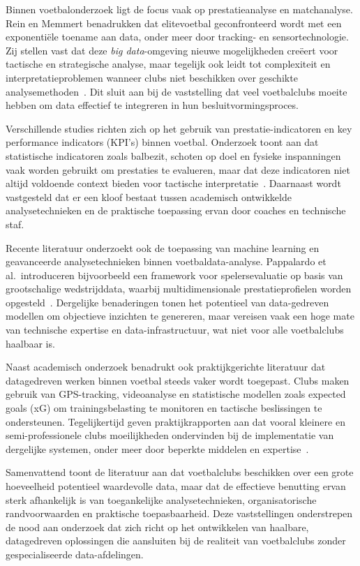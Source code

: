 Binnen voetbalonderzoek ligt de focus vaak op prestatieanalyse en matchanalyse.
Rein en Memmert benadrukken dat elitevoetbal geconfronteerd wordt met een exponentiële toename aan data, onder meer door tracking- en sensortechnologie.
Zij stellen vast dat deze \textit{big data}-omgeving nieuwe mogelijkheden creëert voor tactische en strategische analyse, maar tegelijk ook leidt tot complexiteit en interpretatieproblemen wanneer clubs niet beschikken over geschikte analysemethoden~\autocite{Rein2016}.
Dit sluit aan bij de vaststelling dat veel voetbalclubs moeite hebben om data effectief te integreren in hun besluitvormingsproces.

Verschillende studies richten zich op het gebruik van prestatie-indicatoren en key performance indicators (KPI's) binnen voetbal.
Onderzoek toont aan dat statistische indicatoren zoals balbezit, schoten op doel en fysieke inspanningen vaak worden gebruikt om prestaties te evalueren, maar dat deze indicatoren niet altijd voldoende context bieden voor tactische interpretatie~\autocite{Sarmento2014}.
Daarnaast wordt vastgesteld dat er een kloof bestaat tussen academisch ontwikkelde analysetechnieken en de praktische toepassing ervan door coaches en technische staf.

Recente literatuur onderzoekt ook de toepassing van machine learning en geavanceerde analysetechnieken binnen voetbaldata-analyse.
Pappalardo et al.\ introduceren bijvoorbeeld een framework voor spelersevaluatie op basis van grootschalige wedstrijddata, waarbij multidimensionale prestatieprofielen worden opgesteld~\autocite{Pappalardo2019}.
Dergelijke benaderingen tonen het potentieel van data-gedreven modellen om objectieve inzichten te genereren, maar vereisen vaak een hoge mate van technische expertise en data-infrastructuur, wat niet voor alle voetbalclubs haalbaar is.

Naast academisch onderzoek benadrukt ook praktijkgerichte literatuur dat datagedreven werken binnen voetbal steeds vaker wordt toegepast.
Clubs maken gebruik van GPS-tracking, videoanalyse en statistische modellen zoals expected goals (xG) om trainingsbelasting te monitoren en tactische beslissingen te ondersteunen.
Tegelijkertijd geven praktijkrapporten aan dat vooral kleinere en semi-professionele clubs moeilijkheden ondervinden bij de implementatie van dergelijke systemen, onder meer door beperkte middelen en expertise~\autocite{Gudmundsson2017}.

Samenvattend toont de literatuur aan dat voetbalclubs beschikken over een grote hoeveelheid potentieel waardevolle data, maar dat de effectieve benutting ervan sterk afhankelijk is van toegankelijke analysetechnieken, organisatorische randvoorwaarden en praktische toepasbaarheid.
Deze vaststellingen onderstrepen de nood aan onderzoek dat zich richt op het ontwikkelen van haalbare, datagedreven oplossingen die aansluiten bij de realiteit van voetbalclubs zonder gespecialiseerde data-afdelingen.

